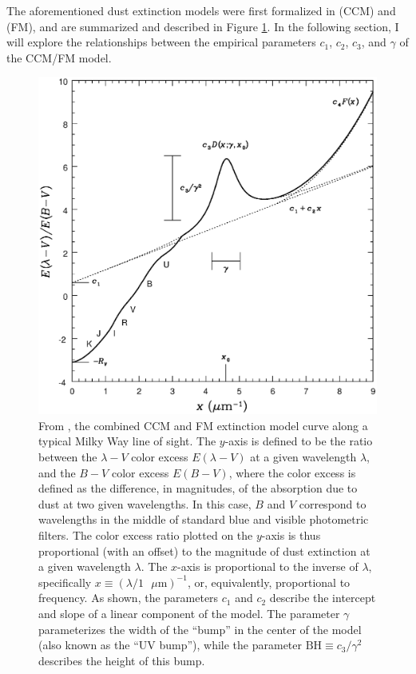 The aforementioned dust extinction models were first formalized in \textcite{cardelli1989relationship} (CCM) and \textcite{fitzpatrick1988analysis} (FM), and are summarized and described in Figure \ref{fig:ccmfm}. In the following section, I will explore the relationships between the empirical parameters $c_1$, $c_2$, $c_3$, and $\gamma$ of the CCM/FM model. 
\begin{figure}
    \centering
    \includegraphics[width=1.0\linewidth]{figures/ccmfm.eps}
    \caption{From \textcite{trotter}, the combined CCM and FM extinction model curve along a typical Milky Way line of sight. The $y$-axis is defined to be the ratio between the $\lambda-V$ color excess $E(\lambda-V)$ at a given wavelength $\lambda$, and the $B-V$ color excess $E(B-V)$, where the color excess is defined as the difference, in magnitudes, of the absorption due to dust at two given wavelengths. In this case, $B$ and $V$ correspond to wavelengths in the middle of standard blue and visible photometric filters. The color excess ratio plotted on the $y$-axis is thus proportional (with an offset) to the magnitude of dust extinction at a given wavelength $\lambda$. The $x$-axis is proportional to the inverse of $\lambda$, specifically $x\equiv(\lambda/1 \text{ $\mu$m})^{-1}$, or, equivalently, proportional to frequency. As shown, the parameters $c_1$ and $c_2$ describe the intercept and slope of a linear component of the model. The parameter $\gamma$ parameterizes the width of the ``bump'' in the center of the model (also known as the ``UV bump''), while the parameter $\text{BH}\equiv c_3/\gamma^2$ describes the height of this bump.}
    \label{fig:ccmfm}
\end{figure}
